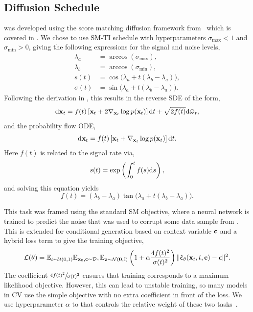 \subsection{Diffusion Schedule}

\pcjedi was developed using the score matching diffusion framework from~\textcite{ScoreBasedGenerativeModeling} which is covered in .
We chose to use SM-TI schedule with hyperparameters $\sigma_\text{max}<1$ and $\sigma_\text{min}>0$, giving the following expressions for the signal and noise levels,
\begin{align}
    \lambda_a & = \arccos(\sigma_\text{max}),                           \\
    \lambda_b & = \arccos(\sigma_\text{min}),                           \\
    s(t)      & = \cos\bigl(\lambda_a + t(\lambda_b - \lambda_a)\bigr), \\
    \sigma(t) & = \sin\bigl(\lambda_a + t(\lambda_b - \lambda_a)\bigr).
\end{align}
Following the derivation in , this results in the reverse SDE of the form,
\begin{equation}
    \label{eq:jedi_reverse_vp_sde}
    \mathrm{d}\mathbf{x}_t = f(t) \left[ \mathbf{x}_t + 2 \nabla_{\mathbf{x}_t} \log p(\mathbf{x}_t) \right] \mathrm{d} t + \sqrt{2 f(t)} \mathrm{d} \bar{\boldsymbol{\omega}}_t,
\end{equation}
and the probability flow ODE,
\begin{equation}
    \label{eq:jedi_vp_ode}
    \mathrm{d} \mathbf{x}_t = f(t) \left[ \mathbf{x}_t + \nabla_{\mathbf{x}_t} \log p(\mathbf{x}_t) \right] \mathrm{d} t.
\end{equation}
Here $f(t)$ is related to the signal rate via,
\begin{equation}
    s(t) = \exp\left(\int_0^t f(s) \mathrm{d} s\right),
\end{equation}
and solving this equation yields
\begin{equation}
    f(t) = (\lambda_b - \lambda_a) \tan\bigl(\lambda_a + t(\lambda_b - \lambda_a)\bigr).
\end{equation}

This task was framed using the standard SM objective, where a neural network is trained to predict the noise that was used to corrupt some data sample from .
This is extended for conditional generation based on context variable $\mathbf{c}$ and a hybrid loss term to give the training objective,
\begin{equation}
    \label{eq:training_objective}
    \mathcal{L}(\theta) =
    \mathbb{E}_{t\sim \mathcal{U}(0, 1)}
    \mathbb{E}_{\mathbf{x}_0, \mathbf{c} \sim \mathcal{D}},
    \mathbb{E}_{\mathbf{z} \sim \mathcal{N}(\mathbf{0}, \mathbb{I})}
    \left(1 + \alpha \frac{4f(t)^2}{\sigma(t)^2}\right)
    \| \hat{\boldsymbol{\epsilon}}_\theta (\mathbf{x}_t, t, \mathbf{c}) - \boldsymbol{\epsilon} \|^2.
\end{equation}
The coefficient $\sfrac{4f(t)^2}{\sigma(t)^2}$ ensures that training corresponds to a maximum likelihood objective.
However, this can lead to unstable training, so many models in CV use the simple objective with no extra coefficient in front of the loss.
We use hyperparameter $\alpha$ to that controls the relative weight of these two tasks~\cite{ImprovedDenoisingDiffusion}.


